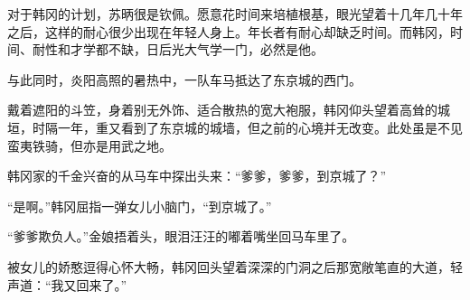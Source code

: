 对于韩冈的计划，苏昞很是钦佩。愿意花时间来培植根基，眼光望着十几年几十年之后，这样的耐心很少出现在年轻人身上。年长者有耐心却缺乏时间。而韩冈，时间、耐性和才学都不缺，日后光大气学一门，必然是他。

与此同时，炎阳高照的暑热中，一队车马抵达了东京城的西门。

戴着遮阳的斗笠，身着别无外饰、适合散热的宽大袍服，韩冈仰头望着高耸的城垣，时隔一年，重又看到了东京城的城墙，但之前的心境并无改变。此处虽是不见蛮夷铁骑，但亦是用武之地。

韩冈家的千金兴奋的从马车中探出头来：“爹爹，爹爹，到京城了？”

“是啊。”韩冈屈指一弹女儿小脑门，“到京城了。”

“爹爹欺负人。”金娘捂着头，眼泪汪汪的嘟着嘴坐回马车里了。

被女儿的娇憨逗得心怀大畅，韩冈回头望着深深的门洞之后那宽敞笔直的大道，轻声道：“我又回来了。”

